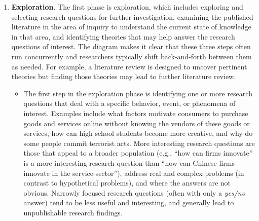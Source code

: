 \begin{enumerate}
	\item \textbf{Exploration}. The first phase is exploration, which includes exploring and selecting research questions for further investigation, examining the published literature in the area of inquiry to understand the current state of knowledge in that area, and identifying theories that may help answer the research questions of interest. The diagram makes it clear that these three steps often run concurrently and researchers typically shift back-and-forth between them as needed. For example, a literature review is designed to uncover pertinent theories but finding those theories may lead to further literature review.

\begin{itemize}
	\item The first step in the exploration phase is identifying one or more research questions that deal with a specific behavior, event, or phenomena of interest. Examples include what factors motivate consumers to purchase goods and services online without knowing the vendors of these goods or services, how can high school students become more creative, and why do some people commit terrorist acts. More 	interesting research questions are those that appeal to a broader population (e.g., ``how can firms innovate'' is a more interesting research question than ``how can Chinese firms innovate in the service-sector''), address real and complex problems (in contrast to hypothetical problems), and where the answers are not obvious. Narrowly focused research questions (often with only a \textit{yes/no} answer) tend to be less useful and interesting, and generally lead to unpublishable research findings.


\end{itemize}
\end{enumerate}
